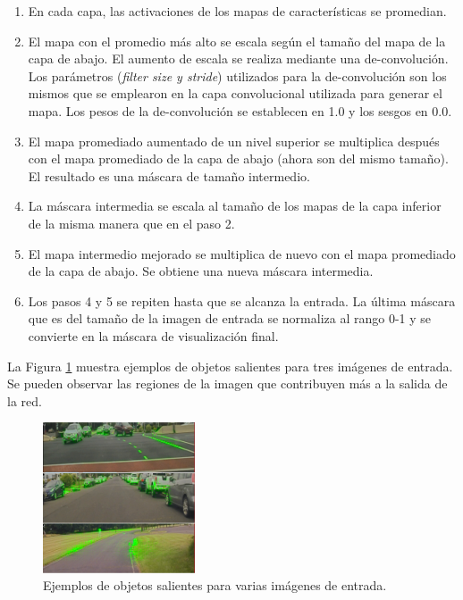 \begin{enumerate}
    \item En cada capa, las activaciones de los mapas de características se promedian.
    \item El mapa con el promedio más alto se escala según el tamaño del mapa de la capa de abajo. El aumento de escala se realiza mediante una de-convolución. Los parámetros (\textit{filter size y stride}) utilizados para la de-convolución son los mismos que se emplearon en la capa convolucional utilizada para generar el mapa. Los pesos de la de-convolución se establecen en 1.0 y los sesgos en 0.0.
    \item El mapa promediado aumentado de un nivel superior se multiplica después con el mapa promediado de la capa de abajo (ahora son del mismo tamaño). El resultado es una máscara de tamaño intermedio.
    \item La máscara intermedia se escala al tamaño de los mapas de la capa inferior de la misma manera que en el paso 2.
    \item El mapa intermedio mejorado se multiplica de nuevo con el mapa promediado de la capa de abajo. Se obtiene una nueva máscara intermedia.
    \item Los pasos 4 y 5 se repiten hasta que se alcanza la entrada. La última máscara que es del tamaño de la imagen de entrada se normaliza al rango 0-1 y se convierte en la máscara de visualización final.
\end{enumerate}

La Figura \ref{fig.salient} muestra ejemplos de objetos salientes para tres imágenes de entrada. Se pueden observar las regiones de la imagen que contribuyen más a la salida de la red.

\begin{figure}
\begin{center}
	\includegraphics[width=0.4\textwidth]{img/saliencia.png}
   \caption{Ejemplos de objetos salientes para varias imágenes de entrada.}
	\label{fig.salient}
\end{center}
\end{figure}


